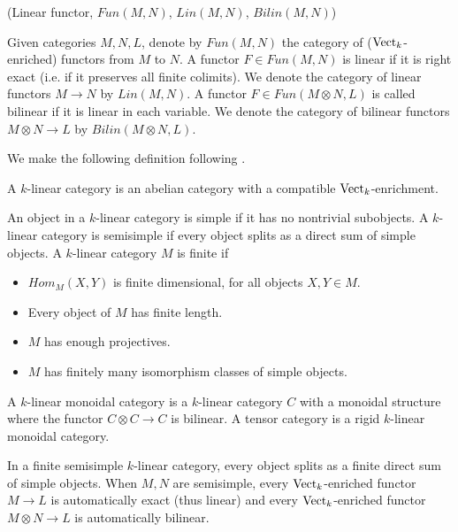 \begin{definition} (Linear functor, $Fun(M,N)$, $Lin(M,N)$, $Bilin(M,N)$)

  \noindent Given categories $M, N, L$, denote by $Fun(M,N)$ the category of
  ($\operatorname{Vect}_k$-enriched) functors from $M$ to $N$. A functor $F \in Fun(M,N)$ is
  linear if it is right exact (i.e. if it preserves all finite colimits). We
  denote the category of linear functors $M \to N$ by $Lin(M,N)$. A functor
  $F \in Fun(M \otimes N, L)$ is called bilinear if it is linear in each
  variable. We denote the category of bilinear functors $M\otimes N \to L$ by
  $Bilin(M\otimes N, L)$.
\end{definition}

\noindent We make the following definition following \cite{douglas/balanced-product}.

\begin{definition} A $k$-linear category is an abelian category with a compatible $\operatorname{Vect}_{k}$-enrichment.
\end{definition}

\begin{definition} \cite{egno/tensor-cats}
  An object in a $k$-linear category is simple if it has no nontrivial
  subobjects. A $k$-linear category is semisimple if every object splits as a
  direct sum of simple objects. A $k$-linear category $M$ is finite if

  \begin{itemize}
    \item $Hom_M(X,Y)$ is finite dimensional, for all objects $X,Y\in M$.
    \item Every object of $M$ has finite length.
    \item $M$ has enough projectives.
    \item $M$ has finitely many isomorphism classes of simple objects.
  \end{itemize}
  A $k$-linear monoidal category is a $k$-linear category $C$ with a monoidal
  structure where the functor $C\otimes C\to C$ is bilinear. A tensor category
  is a rigid $k$-linear monoidal category.
\end{definition}

\noindent In a finite semisimple $k$-linear category, every object splits as a
finite direct sum of simple objects. When $M,N$ are semisimple, every
$\operatorname{Vect}_{k}$-enriched functor $M\to L$ is automatically exact (thus linear) and
every $\operatorname{Vect}_{k}$-enriched functor $M\otimes N\to L$ is automatically
bilinear.

